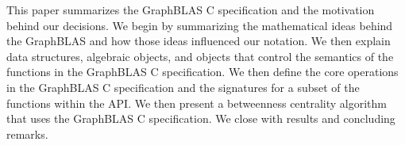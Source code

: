 This paper summarizes the GraphBLAS C specification and the
motivation behind our decisions. 
We begin by summarizing the 
mathematical ideas behind the GraphBLAS and how those ideas
influenced our notation.  We then explain data structures,
algebraic objects, and objects that control the semantics of the functions
in the GraphBLAS C specification.  We then define the
core operations in the GraphBLAS C  specification and the signatures
for a subset of the functions  within the API.  We then present a betweenness centrality 
algorithm that uses the GraphBLAS C  specification. We close with results
and concluding remarks.
